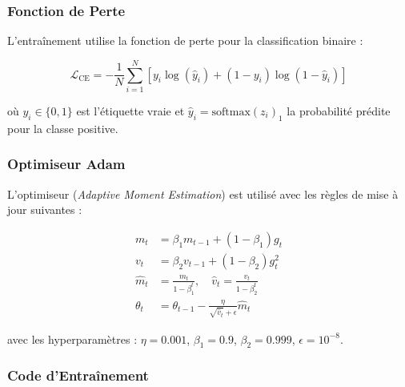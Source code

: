 \subsubsection{Fonction de Perte}

L'entraînement utilise la fonction de perte  pour la classification binaire :

\begin{equation}
\mathcal{L}_{\text{CE}} = -\frac{1}{N} \sum_{i=1}^{N} \left[ y_i \log(\hat{y}_i) + (1 - y_i) \log(1 - \hat{y}_i) \right]
\label{eq:cross_entropy}
\end{equation}

où $y_i \in \{0, 1\}$ est l'étiquette vraie et $\hat{y}_i = \text{softmax}(z_i)_1$ la probabilité prédite pour la classe positive.

\subsubsection{Optimiseur Adam}

L'optimiseur  (\textit{Adaptive Moment Estimation}) est utilisé avec les règles de mise à jour suivantes :

\begin{align}
m_t &= \beta_1 m_{t-1} + (1 - \beta_1) g_t \label{eq:adam_m} \\
v_t &= \beta_2 v_{t-1} + (1 - \beta_2) g_t^2 \label{eq:adam_v} \\
\hat{m}_t &= \frac{m_t}{1 - \beta_1^t}, \quad \hat{v}_t = \frac{v_t}{1 - \beta_2^t} \label{eq:adam_bias} \\
\theta_t &= \theta_{t-1} - \frac{\eta}{\sqrt{\hat{v}_t} + \epsilon} \hat{m}_t \label{eq:adam_update}
\end{align}

avec les hyperparamètres : $\eta = 0.001$, $\beta_1 = 0.9$, $\beta_2 = 0.999$, $\epsilon = 10^{-8}$.

\subsubsection{Code d'Entraînement}

